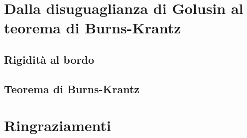 \documentclass{article}
\begin{document}
\newpage

\section{Dalla disuguaglianza di Golusin al teorema di Burns-Krantz}

\subsection{Rigidità al bordo}


\subsection{Teorema di Burns-Krantz}


\newpage



\section*{Ringraziamenti}

\end{document}

